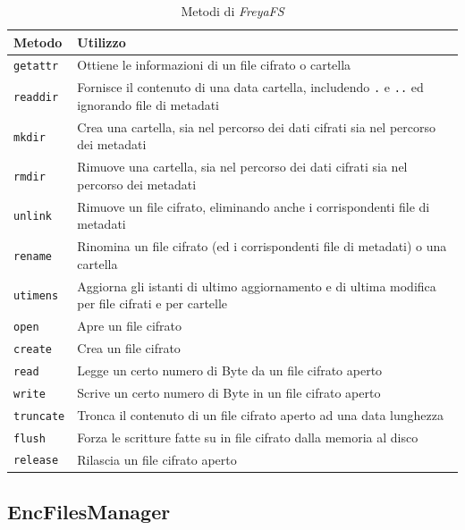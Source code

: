 \documentclass[a4paper,12pt,twoside,openright]{report}
\begin{document}
  \begin{table}[h!]
    \centering
    \begin{tabular}{|p{3cm}|p{11cm}|} 
      \hline
      Metodo & Utilizzo \\ [0.5ex] 
      \hline\hline
      \texttt{getattr} & Ottiene le informazioni di un file cifrato o cartella \\ 
      \hline
      \texttt{readdir} & Fornisce il contenuto di una data cartella, includendo \texttt{.} e \texttt{..} ed ignorando file di metadati \\
      \hline
      \texttt{mkdir} & Crea una cartella, sia nel percorso dei dati cifrati sia nel percorso dei metadati \\
      \hline
      \texttt{rmdir} & Rimuove una cartella, sia nel percorso dei dati cifrati sia nel percorso dei metadati \\
      \hline
      \texttt{unlink} & Rimuove un file cifrato, eliminando anche i corrispondenti file di metadati \\
      \hline
      \texttt{rename} & Rinomina un file cifrato (ed i corrispondenti file di metadati) o una cartella \\
      \hline
      \texttt{utimens} & Aggiorna gli istanti di ultimo aggiornamento e di ultima modifica per file cifrati e per cartelle \\
      \hline
      \texttt{open} & Apre un file cifrato \\
      \hline
      \texttt{create} & Crea un file cifrato \\
      \hline
      \texttt{read} & Legge un certo numero di Byte da un file cifrato aperto \\
      \hline
      \texttt{write} & Scrive un certo numero di Byte in un file cifrato aperto \\
      \hline
      \texttt{truncate} & Tronca il contenuto di un file cifrato aperto ad una data lunghezza \\
      \hline
      \texttt{flush} & Forza le scritture fatte su in file cifrato dalla memoria al disco \\
      \hline
      \texttt{release} & Rilascia un file cifrato aperto \\
      \hline
    \end{tabular}
    \caption{Metodi di \textit{FreyaFS}}
    \label{table-freyafs}
  \end{table}

  \subsection{EncFilesManager}
  \label{enc-files-manager}
\end{document}
